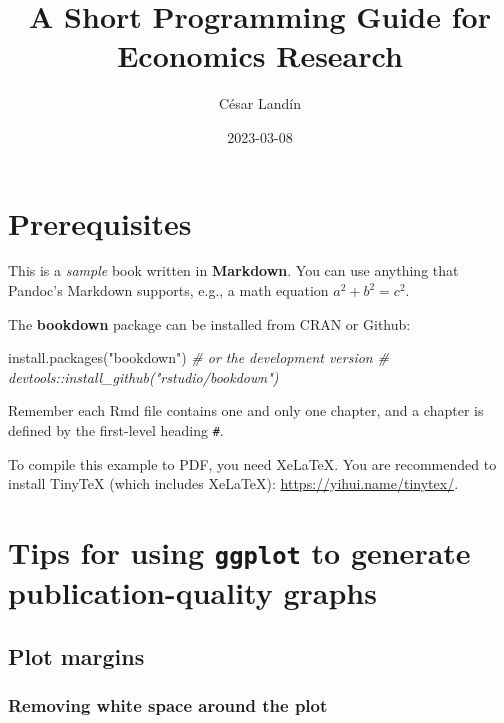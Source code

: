 \documentclass[
]{book}
\title{A Short Programming Guide for Economics Research}
\author{César Landín}
\date{2023-03-08}
\newenvironment{Shaded}{\begin{snugshade}}{\end{snugshade}}
\newcommand{\CommentTok}[1]{\textcolor[rgb]{0.56,0.35,0.01}{\textit{#1}}}
\newcommand{\FunctionTok}[1]{\textcolor[rgb]{0.00,0.00,0.00}{#1}}
\newcommand{\NormalTok}[1]{#1}
\newcommand{\StringTok}[1]{\textcolor[rgb]{0.31,0.60,0.02}{#1}}
\begin{document}
\maketitle

{
\setcounter{tocdepth}{1}
\tableofcontents
}
\hypertarget{prerequisites}{%
\chapter{Prerequisites}\label{prerequisites}}

This is a \emph{sample} book written in \textbf{Markdown}. You can use anything that Pandoc's Markdown supports, e.g., a math equation \(a^2 + b^2 = c^2\).

The \textbf{bookdown} package can be installed from CRAN or Github:

\begin{Shaded}
\begin{Highlighting}[]
\FunctionTok{install.packages}\NormalTok{(}\StringTok{"bookdown"}\NormalTok{)}
\CommentTok{\# or the development version}
\CommentTok{\# devtools::install\_github("rstudio/bookdown")}
\end{Highlighting}
\end{Shaded}

Remember each Rmd file contains one and only one chapter, and a chapter is defined by the first-level heading \texttt{\#}.

To compile this example to PDF, you need XeLaTeX. You are recommended to install TinyTeX (which includes XeLaTeX): \url{https://yihui.name/tinytex/}.

\hypertarget{ggplot}{%
\chapter{\texorpdfstring{Tips for using \texttt{ggplot} to generate publication-quality graphs}{Tips for using ggplot to generate publication-quality graphs}}\label{ggplot}}

\hypertarget{plot-margins}{%
\section{Plot margins}\label{plot-margins}}

\hypertarget{removing-white-space-around-the-plot}{%
\subsection{Removing white space around the plot}\label{removing-white-space-around-the-plot}}
\end{document}
